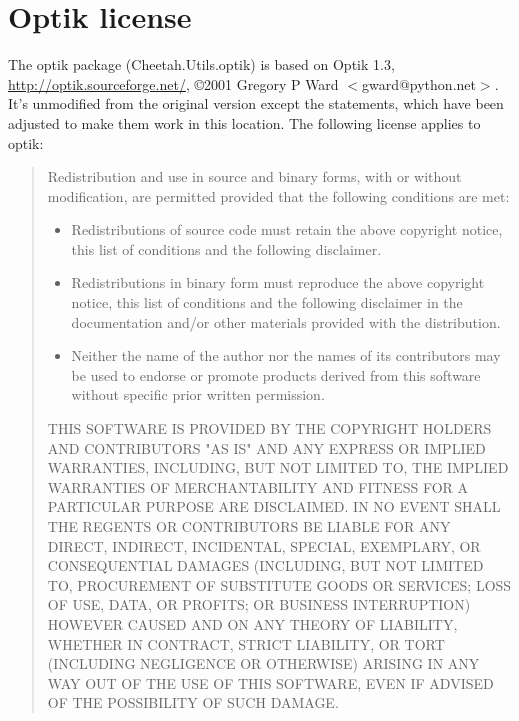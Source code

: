 \section{Optik license}
\label{optikLicense}

The optik package (Cheetah.Utils.optik) is based on Optik 1.3,
\url{http://optik.sourceforge.net/}, \copyright 2001 Gregory P Ward
$<$gward@python.net$>$.  It's unmodified from the original version except
the  statements, which have been adjusted to make them work in
this location.  The following license applies to optik:

\begin{quotation}
Redistribution and use in source and binary forms, with or without
modification, are permitted provided that the following conditions are
met:

\begin{itemize}
\item Redistributions of source code must retain the above copyright
    notice, this list of conditions and the following disclaimer.
  
\item Redistributions in binary form must reproduce the above copyright
    notice, this list of conditions and the following disclaimer in the
    documentation and/or other materials provided with the distribution.

\item Neither the name of the author nor the names of its
    contributors may be used to endorse or promote products derived from
    this software without specific prior written permission.
\end{itemize}

THIS SOFTWARE IS PROVIDED BY THE COPYRIGHT HOLDERS AND CONTRIBUTORS "AS
IS" AND ANY EXPRESS OR IMPLIED WARRANTIES, INCLUDING, BUT NOT LIMITED
TO, THE IMPLIED WARRANTIES OF MERCHANTABILITY AND FITNESS FOR A
PARTICULAR PURPOSE ARE DISCLAIMED. IN NO EVENT SHALL THE REGENTS OR
CONTRIBUTORS BE LIABLE FOR ANY DIRECT, INDIRECT, INCIDENTAL, SPECIAL,
EXEMPLARY, OR CONSEQUENTIAL DAMAGES (INCLUDING, BUT NOT LIMITED TO,
PROCUREMENT OF SUBSTITUTE GOODS OR SERVICES; LOSS OF USE, DATA, OR
PROFITS; OR BUSINESS INTERRUPTION) HOWEVER CAUSED AND ON ANY THEORY OF
LIABILITY, WHETHER IN CONTRACT, STRICT LIABILITY, OR TORT (INCLUDING
NEGLIGENCE OR OTHERWISE) ARISING IN ANY WAY OUT OF THE USE OF THIS
SOFTWARE, EVEN IF ADVISED OF THE POSSIBILITY OF SUCH DAMAGE.
\end{quotation}

